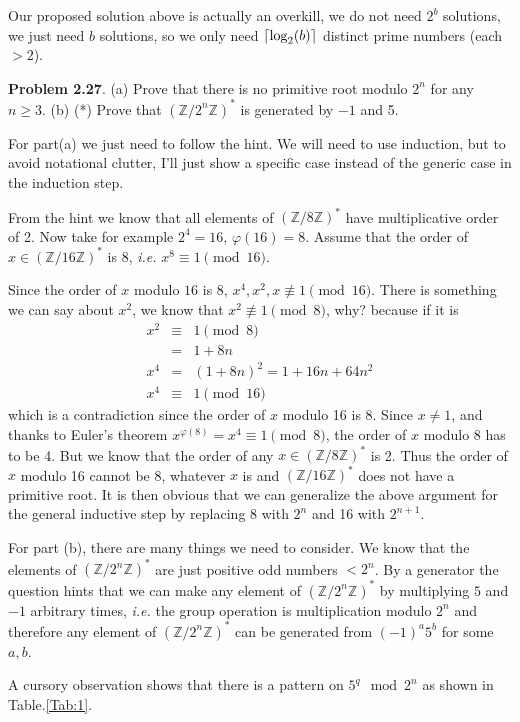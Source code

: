 \documentclass[aps,preprint,preprintnumbers,nofootinbib,showpacs,prd]{revtex4-1}
\newcommand{\ie}{{\it i.e.} }
\newcommand{\nbea}{\begin{eqnarray*}}
\newcommand{\neea}{\end{eqnarray*}}
\DeclarePairedDelimiter{\ceil}{\lceil}{\rceil}
\begin{document}
Our proposed solution above is actually an overkill, we do not need $2^b$ solutions, we just need $b$ solutions, so we only need $\ceil{\log_2(b)}$ distinct prime numbers (each $>2$).
 
{\bf Problem 2.27}. (a) Prove that there is no primitive root modulo $2^n$ for any $n \ge 3$.
(b) (*) Prove that $(\mathbb{Z}/2^n\mathbb{Z})^*$ is generated by $-1$ and 5.

For part(a) we just need to follow the hint. We will need to use induction, but to avoid notational clutter, I'll just show a specific case instead of the generic case in the induction step.

From the hint we know that all elements of $(\mathbb{Z}/8\mathbb{Z})^*$ have multiplicative order of 2. Now take for example $2^4 = 16$, $\varphi(16) = 8$. Assume that the order of $x \in (\mathbb{Z}/16\mathbb{Z})^*$ is 8, \ie $x^8 \equiv 1 \pmod{16}$.

Since the order of $x$ modulo ${16}$  is 8, $x^4, x^2, x \not\equiv 1 \pmod{16}$. There is something we can say about $x^2$, we know that $x^2 \not\equiv 1 \pmod{8}$, why? because if it is
%
\nbea
x^2 & \equiv & 1 \pmod{8} \\
& = & 1 + 8n \\
x^4 & = & (1+8n)^2 = 1 + 16n + 64n^2 \\
x^4 & \equiv & 1 \pmod{16}
\neea
%
which is a contradiction since the order of $x$ modulo 16 is 8. Since $x \neq 1$, and thanks to Euler's theorem $x^{\varphi(8)} = x^4 \equiv 1 \pmod{8}$, the order of $x$ modulo 8 has to be 4. But we know that the order of any $x \in (\mathbb{Z}/8\mathbb{Z})^*$ is 2. Thus the order of $x$ modulo 16 cannot be 8, whatever $x$ is and $(\mathbb{Z}/16\mathbb{Z})^*$ does not have a primitive root. It is then obvious that we can generalize the above argument for the general inductive step by replacing 8 with $2^n$ and 16 with $2^{n+1}$.

For part (b), there are many things we need to consider. We know that the elements of $(\mathbb{Z}/2^n\mathbb{Z})^*$ are just positive odd numbers $< 2^n$. By a generator the question hints that we can make any element of $(\mathbb{Z}/2^n\mathbb{Z})^*$ by multiplying $5$ and $-1$ arbitrary times, \ie the group operation is multiplication modulo $2^n$ and therefore any element of $(\mathbb{Z}/2^n\mathbb{Z})^*$ can be generated from $(-1)^a 5^b$ for some $a,b$.

A cursory observation shows that there is a pattern on $5^q \mod 2^n$ as shown in Table.\ref{Tab:1}.
\end{document}
